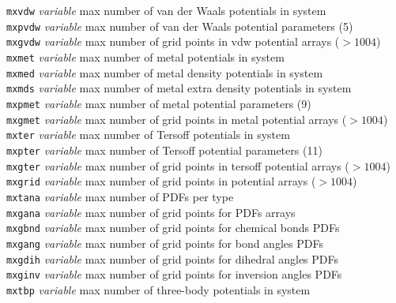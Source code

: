 \begin{tabbing}
\> {\tt mxvdw}       \> {\em variable}       \> max number of van der Waals potentials in system \\
\> {\tt mxpvdw}      \> {\em variable}       \> max number of van der Waals potential parameters (5) \\
\> {\tt mxgvdw}      \> {\em variable}       \> max number of grid points in vdw potential arrays ($> 1004$) \\
\> {\tt mxmet}       \> {\em variable}       \> max number of metal potentials in system \\
\> {\tt mxmed}       \> {\em variable}       \> max number of metal density potentials in system \\
\> {\tt mxmds}       \> {\em variable}       \> max number of metal extra density potentials in system \\
\> {\tt mxpmet}      \> {\em variable}       \> max number of metal potential parameters (9) \\
\> {\tt mxgmet}      \> {\em variable}       \> max number of grid points in metal potential arrays ($> 1004$)\\
\> {\tt mxter}       \> {\em variable}       \> max number of Tersoff potentials in system \\
\> {\tt mxpter}      \> {\em variable}       \> max number of Tersoff potential parameters (11) \\
\> {\tt mxgter}      \> {\em variable}       \> max number of grid points in tersoff potential arrays ($> 1004$)\\
\> {\tt mxgrid}      \> {\em variable}       \> max number of grid points in potential arrays ($> 1004$)\\
\> {\tt mxtana}      \> {\em variable}       \> max number of PDFs per type \\
\> {\tt mxgana}      \> {\em variable}       \> max number of grid points for PDFs arrays \\
\> {\tt mxgbnd}      \> {\em variable}       \> max number of grid points for chemical bonds PDFs \\
\> {\tt mxgang}      \> {\em variable}       \> max number of grid points for bond angles PDFs \\
\> {\tt mxgdih}      \> {\em variable}       \> max number of grid points for dihedral angles PDFs \\
\> {\tt mxginv}      \> {\em variable}       \> max number of grid points for inversion angles PDFs \\
\> {\tt mxtbp}       \> {\em variable}       \> max number of three-body potentials in system \\

\end{tabbing}
